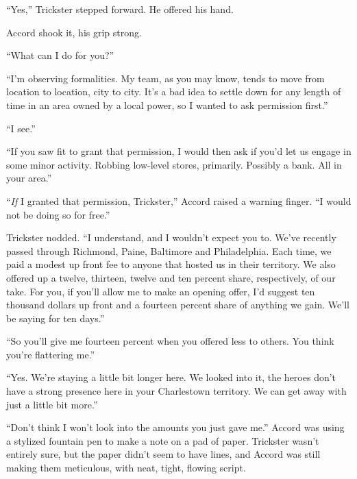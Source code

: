 ``Yes,'' Trickster stepped forward.  He offered his hand.



Accord shook it, his grip strong.



``What can I do for you?''



``I'm observing formalities.  My team, as you may know, tends to move from location to location, city to city.  It's a bad idea to settle down for any length of time in an area owned by a local power, so I wanted to ask permission first.''



``I see.''



``If you saw fit to grant that permission, I would then ask if you'd let us engage in some minor activity.  Robbing low-level stores, primarily.  Possibly a bank.  All in your area.''



``\emph{If} I granted that permission, Trickster,'' Accord raised a warning finger. ``I would not be doing so for free.''



Trickster nodded.  ``I understand, and I wouldn't expect you to.  We've recently passed through Richmond, Paine, Baltimore and Philadelphia.  Each time, we paid a modest up front fee to anyone that hosted us in their territory.  We also offered up a twelve, thirteen, twelve and ten percent share, respectively, of our take.  For you, if you'll allow me to make an opening offer, I'd suggest ten thousand dollars up front and a fourteen percent share of anything we gain.  We'll be saying for ten days.''



``So you'll give me fourteen percent when you offered less to others.  You think you're flattering me.''



``Yes.  We're staying a little bit longer here.  We looked into it, the heroes don't have a strong presence here in your Charlestown territory.  We can get away with just a little bit more.''



``Don't think I won't look into the amounts you just gave me.''  Accord was using a stylized fountain pen to make a note on a pad of paper.  Trickster wasn't entirely sure, but the paper didn't seem to have lines, and Accord was still making them meticulous, with neat, tight, flowing script.



